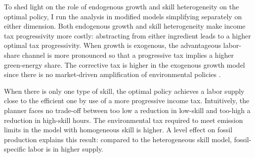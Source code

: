 To shed light on the role of endogenous growth and skill heterogeneity on the optimal policy, I run the analysis in modified models simplifying separately on either dimension. 
Both endogenous growth and skill heterogeneity make income tax progressivity more costly: abstracting from either ingredient leads to a higher optimal tax progressivity. 
When growth is exogenous, the advantageous labor-share channel is more pronounced so that a progressive tax implies a higher green-energy share. The corrective tax is higher in the exogenous growth model since there is no market-driven amplification of environmental policies \citep[a finding stressed in ][]{Fried2018ClimateAnalysis}. 

When there is only one type of skill, the optimal policy achieves a labor supply close to the efficient one by use of a more progressive income tax. Intuitively, the planner faces no trade-off between too low a reduction in low-skill and too-high a reduction in high-skill hours.
The environmental tax required to meet emission limits in the model with homogeneous skill is higher. A level effect on fossil production  explains this result: compared to the heterogeneous skill model, fossil-specific labor is in higher supply.%



